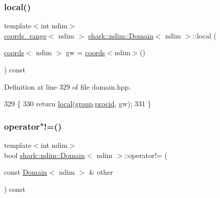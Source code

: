 \subsubsection{\texorpdfstring{local()}{local()}\hspace{0.1cm}{\footnotesize\ttfamily [2/2]}}
{\footnotesize\ttfamily template$<$int ndim$>$ \\
\hyperlink{structshark_1_1ndim_1_1coords__range}{coords\+\_\+range}$<$ ndim $>$ \hyperlink{classshark_1_1ndim_1_1_domain}{shark\+::ndim\+::\+Domain}$<$ ndim $>$\+::local (\begin{DoxyParamCaption}\item[{\hyperlink{structshark_1_1ndim_1_1coords}{coords}$<$ ndim $>$}]{gw = {\ttfamily \hyperlink{structshark_1_1ndim_1_1coords}{coords}$<$ndim$>$()} }\end{DoxyParamCaption}) const\hspace{0.3cm}{\ttfamily [inline]}}



Definition at line 329 of file domain.\+hpp.


\begin{DoxyCode}
329                                                                            \{
330             \textcolor{keywordflow}{return} \hyperlink{classshark_1_1ndim_1_1_domain_a3351db56f9d6bd22ba473d744e3f7025}{local}(\hyperlink{classshark_1_1ndim_1_1_domain_a2bbf100371762ce405efd218bc1e3d0f}{group}.\hyperlink{classshark_1_1_group_af8c22a10243c3d05301280119b72c073}{procid}, gw);
331         \}
\end{DoxyCode}
\hypertarget{classshark_1_1ndim_1_1_domain_a362605b2c4faa8f7164433f647bcd6cb}{}\label{classshark_1_1ndim_1_1_domain_a362605b2c4faa8f7164433f647bcd6cb} 
\subsubsection{\texorpdfstring{operator"!=()}{operator!=()}}
{\footnotesize\ttfamily template$<$int ndim$>$ \\
bool \hyperlink{classshark_1_1ndim_1_1_domain}{shark\+::ndim\+::\+Domain}$<$ ndim $>$\+::operator!= (\begin{DoxyParamCaption}\item[{const \hyperlink{classshark_1_1ndim_1_1_domain}{Domain}$<$ ndim $>$ \&}]{other }\end{DoxyParamCaption}) const\hspace{0.3cm}{\ttfamily [inline]}}


